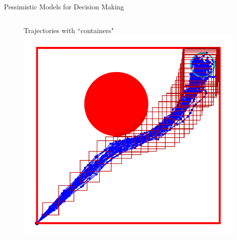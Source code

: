 \documentclass[lecture]{beamer}
\begin{document}
\begin{frame}{\normalsize Pessimistic Models for Decision Making}
\begin{columns}[t]
\begin{overlayarea}{\textwidth}{0.6\textheight}
\begin{figure}
{        }%
        {%
                \center
        Trajectories with ``containers"
   \includegraphics[width=\FS\textwidth]{Codes/BasicsSafety/PessimisticModel40.pdf}%
        }%
    \end{figure}
    
    
  \end{overlayarea} 



\end{columns}
\end{frame}
\end{document}

